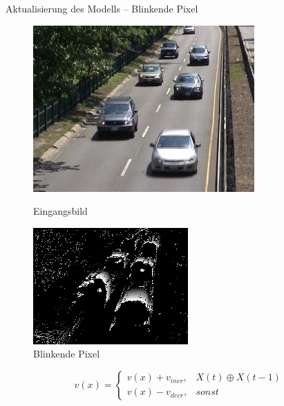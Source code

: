 \documentclass[hyperref={pdfpagelabels=false}]{beamer}
\begin{document}
\begin{frame}[t]{Aktualisierung des Modells -- Blinkende Pixel}
	\vspace{1.65em}
	\begin{figure}
		\centering
		\begin{minipage}{0.45\linewidth}
			\includegraphics[width=1\linewidth]{Abbildungen/Eingang3.jpg}
			\caption*{Eingangsbild}
		\end{minipage}
		\begin{minipage}{0.45\linewidth}
			\includegraphics[width=1\linewidth]{Abbildungen/blinking_pixels1.jpg}
			\caption*{Blinkende Pixel}
		\end{minipage}
	\end{figure}
	\bigskip
	\begin{equation*}
		v(x)= 	\left\{
				\begin{array}{ll} 
					v(x) + v_{incr}, &  X(t) \oplus X(t-1) \\
					v(x) - v_{decr}, & sonst
				\end{array}
			\right .
	\end{equation*}
\end{frame}
\end{document}
